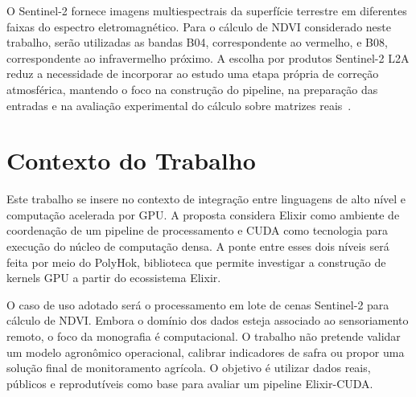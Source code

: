 \documentclass[tcc,capa]{texufpel}
\begin{document}
O Sentinel-2 fornece imagens multiespectrais da superfície terrestre em diferentes
faixas do espectro eletromagnético. Para o cálculo de NDVI considerado neste
trabalho, serão utilizadas as bandas B04, correspondente ao vermelho, e B08,
correspondente ao infravermelho próximo. A escolha por produtos Sentinel-2 L2A
reduz a necessidade de incorporar ao estudo uma etapa própria de correção
atmosférica, mantendo o foco na construção do pipeline, na preparação das entradas e
na avaliação experimental do cálculo sobre matrizes reais~\cite{copernicusSentinel2Docs2026}.

\section{Contexto do Trabalho}

Este trabalho se insere no contexto de integração entre linguagens de alto nível e
computação acelerada por GPU. A proposta considera Elixir como ambiente de
coordenação de um pipeline de processamento e CUDA como tecnologia para execução
do núcleo de computação densa. A ponte entre esses dois níveis será feita por meio do
PolyHok, biblioteca que permite investigar a construção de kernels GPU a partir do
ecossistema Elixir.

O caso de uso adotado será o processamento em lote de cenas Sentinel-2 para cálculo
de NDVI. Embora o domínio dos dados esteja associado ao sensoriamento remoto, o
foco da monografia é computacional. O trabalho não pretende validar um modelo
agronômico operacional, calibrar indicadores de safra ou propor uma solução final de
monitoramento agrícola. O objetivo é utilizar dados reais, públicos e reprodutíveis
como base para avaliar um pipeline Elixir-CUDA.
\end{document}
